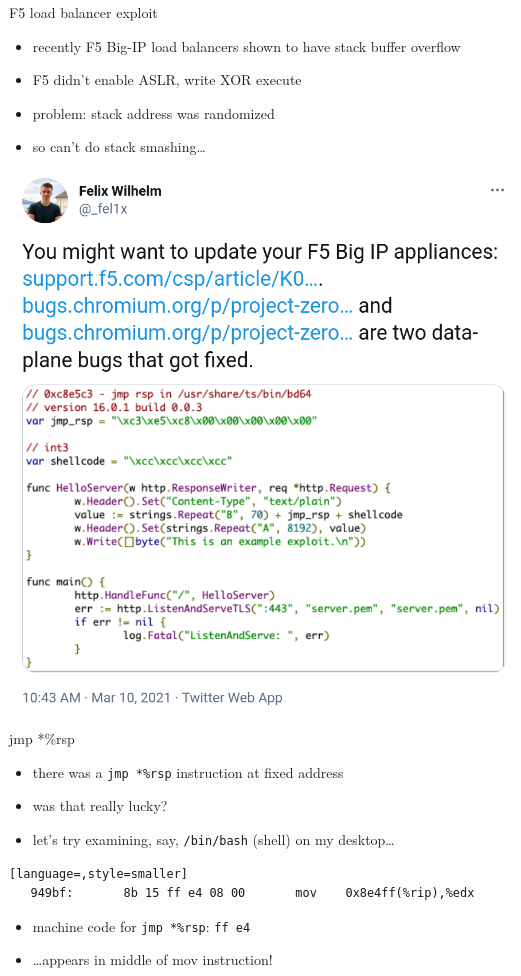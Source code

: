 \begin{frame}{F5 load balancer exploit}
\begin{itemize}
\item recently F5 Big-IP load balancers shown to have stack buffer overflow
\item F5 didn't enable ASLR, write XOR execute
\item problem: stack address was randomized
\item so can't do stack smashing\ldots
\end{itemize}
\end{frame}

\begin{frame}[plain]{}
\includegraphics[height=0.95\textheight]{../rop/f5-poc-twitter}
\end{frame}

\begin{frame}[fragile,label=jmpRsp]{jmp *\%rsp}
    \begin{itemize}
    \item there was a \texttt{jmp *\%rsp} instruction at fixed address
    \vspace{.5cm}
    \item was that really lucky?
    \item let's try examining, say, \texttt{/bin/bash} (shell) on my desktop\ldots
    \end{itemize}
\begin{lstlisting}[language=,style=smaller]
   949bf:       8b 15 ff e4 08 00       mov    0x8e4ff(%rip),%edx
\end{lstlisting}
    \begin{itemize}
        \item machine code for \texttt{jmp *\%rsp}: \texttt{ff e4}
        \item \ldots appears in middle of mov instruction!
    \end{itemize}
\end{frame}


